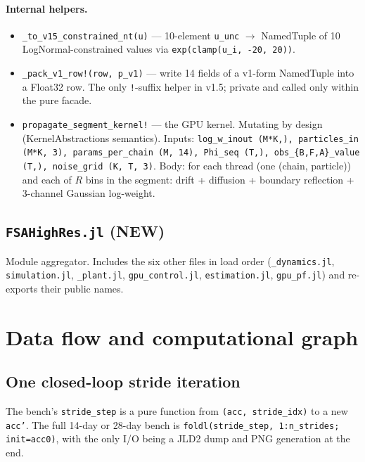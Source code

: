 \documentclass[11pt,a4paper]{article}
\begin{document}
\paragraph{Internal helpers.}

\begin{itemize}[itemsep=2pt,leftmargin=*]
\item \texttt{\_to\_v15\_constrained\_nt(u)} --- 10-element
  \texttt{u\_unc} $\to$ NamedTuple of 10 LogNormal-constrained
  values via \texttt{exp(clamp(u\_i, -20, 20))}.

\item \texttt{\_pack\_v1\_row!(row, p\_v1)} --- write 14 fields of a
  v1-form NamedTuple into a Float32 row. The only \texttt{!}-suffix
  helper in v1.5; private and called only within the pure facade.

\item \texttt{propagate\_segment\_kernel!} --- the GPU kernel.
  Mutating by design (KernelAbstractions semantics). Inputs:
  \texttt{log\_w\_inout (M*K,), particles\_in (M*K, 3),
  params\_per\_chain (M, 14), Phi\_seq (T,), obs\_\{B,F,A\}\_value
  (T,), noise\_grid (K, T, 3)}. Body: for each thread (one (chain,
  particle)) and each of $R$ bins in the segment: drift + diffusion
  + boundary reflection + 3-channel Gaussian log-weight.
\end{itemize}

\subsection{\texttt{FSAHighRes.jl} (NEW)}

Module aggregator. Includes the six other files in load order
(\texttt{\_dynamics.jl}, \texttt{simulation.jl}, \texttt{\_plant.jl},
\texttt{gpu\_control.jl}, \texttt{estimation.jl}, \texttt{gpu\_pf.jl})
and re-exports their public names.

\section{Data flow and computational graph}
\label{sec:dataflow}

\subsection{One closed-loop stride iteration}

The bench's \texttt{stride\_step} is a pure function from
\texttt{(acc, stride\_idx)} to a new \texttt{acc'}. The full
14-day or 28-day bench is \texttt{foldl(stride\_step, 1:n\_strides;
init=acc0)}, with the only I/O being a JLD2 dump and PNG generation
at the end.
\end{document}
